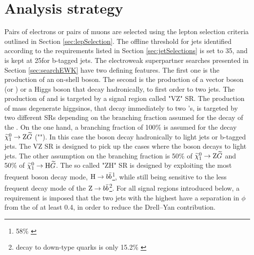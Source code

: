\section{Analysis strategy}      
\noindent
\justify
Pairs of electrons or pairs of muons are selected using the lepton selection criteria outlined in Section \ref{sec:lepSelection}.
The offline \pt threshold for jets identified according to the requirements listed in Section \ref{sec:jetSelections} is set to 35\GeV, and is kept at 25\GeV for b-tagged jets.
The electroweak superpartner searches presented in Section \ref{sec:searchEWK} have two defining features. 
The first one is the production of an on-shell \PZ boson.
The second is the production of a vector boson (\PW or \PZ) or a Higgs boson that decay hadronically, to first order to two jets. 
The production of \firstcharg and \PSGczDt is targeted by a signal region called "VZ" SR. 
The production of mass degenerate higgsinos, that decay immediately to two \PSGczDo's, is targeted by two different SRs depending on the branching fraction assumed for the decay of the \PSGczDo.
On the one hand, a branching fraction of 100\% is assumed for the decay $\widetilde{\chi}^{0}_{1}\rightarrow\mathrm{Z}\widetilde{G}$ ("\PZZ").  
In this case the \PZ boson decay hadronically to light jets or b-tagged jets. The VZ SR is designed to pick up the cases where the \PZ boson decays to light jets.
The other assumption on the branching fraction is 50\% of $\widetilde{\chi}^{0}_{1}\rightarrow\mathrm{Z}\widetilde{G}$ and 50\% of $\widetilde{\chi}^{0}_{1}\rightarrow\mathrm{H}\widetilde{G}$. 
The so called "ZH" SR is designed by exploiting the most frequent \PH boson decay mode, $\mathrm{H}\rightarrow b\bar{b}$\footnote{58\% \cite{deFlorian:2016spz}}, while still being sensitive to the less frequent decay mode of the $\mathrm{Z}\rightarrow b\bar{b}$\footnote{\PZ decay to down-type quarks is only 15.2\% \cite{PhysRevD.98.030001}}.   
For all signal regions introduced below, a requirement is imposed that the two jets with the highest \pt have a separation in $\phi$ from the \ptmiss of at least 0.4, in order to reduce the Drell--Yan contribution.
